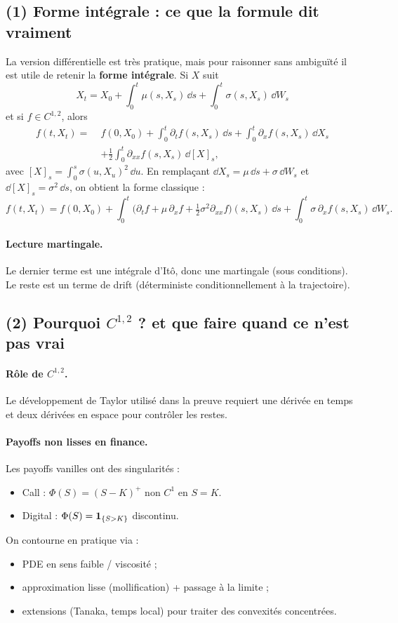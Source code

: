 
\subsection*{(1) Forme intégrale : ce que la formule dit vraiment}
La version différentielle est très pratique, mais pour raisonner sans ambiguïté il est utile de retenir la \textbf{forme intégrale}.
Si $X$ suit
\[
X_t=X_0+\int_0^t \mu(s,X_s)\,\dd s+\int_0^t \sigma(s,X_s)\,\dd W_s
\]
et si $f\in C^{1,2}$, alors
\[
\boxed{
\begin{aligned}
f(t,X_t)=\;&f(0,X_0)
 +\int_0^t \partial_t f(s,X_s)\,\dd s
 +\int_0^t \partial_x f(s,X_s)\,\dd X_s\\
&+\frac12\int_0^t \partial_{xx} f(s,X_s)\,\dd [X]_s,
\end{aligned}}
\]
avec $[X]_s=\int_0^s \sigma(u,X_u)^2\,\dd u$.
En remplaçant $\dd X_s=\mu\,\dd s+\sigma\,\dd W_s$ et $\dd[X]_s=\sigma^2\,\dd s$, on obtient la forme classique :
\[
f(t,X_t)=f(0,X_0)
\!+\!\int_0^t\!\Big(\partial_t f+\mu\,\partial_x f+\tfrac12\sigma^2\partial_{xx} f\Big)(s,X_s)\,\dd s
\!+\!\int_0^t\!\sigma\,\partial_x f(s,X_s)\,\dd W_s.
\]
\paragraph{Lecture martingale.}
Le dernier terme est une intégrale d'Itô, donc une martingale (sous conditions). Le reste est un terme de drift (déterministe conditionnellement à la trajectoire).

\subsection*{(2) Pourquoi $C^{1,2}$ ? et que faire quand ce n'est pas vrai}
\paragraph{Rôle de $C^{1,2}$.}
Le développement de Taylor utilisé dans la preuve requiert une dérivée en temps et deux dérivées en espace pour contrôler les restes.

\paragraph{Payoffs non lisses en finance.}
Les payoffs vanilles ont des singularités :
\begin{itemize}[leftmargin=*]
\item Call : $\Phi(S)=(S-K)^+$ non $C^1$ en $S=K$.
\item Digital : $\Phi(S)=\mathbf{1}_{\{S>K\}}$ discontinu.
\end{itemize}
On contourne en pratique via :
\begin{itemize}[leftmargin=*]
\item PDE en sens faible / viscosité ;
\item approximation lisse (mollification) + passage à la limite ;
\item extensions (Tanaka, temps local) pour traiter des convexités concentrées.
\end{itemize}

